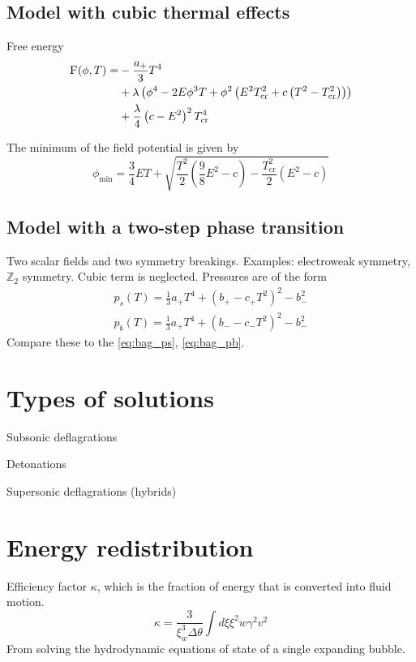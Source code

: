 \subsection{Model with cubic thermal effects}
Free energy
\cite[eq. 45]{giese_2020}
\begin{align}
\begin{split}
\textsc{F}(\phi, T) =
&- \frac{a_+}{3} T^4 \\
&+ \lambda \left( \phi^4 - 2E\phi^3 T + \phi^2 \left( E^2 T_\text{cr}^2 + c \left( T^2 - T_\text{cr}^2 \right) \right) \right) \\
&+ \frac{\lambda}{4} \left( c - E^2 \right)^2 T_\text{cr}^4
\end{split}
\end{align}

The minimum of the field potential is given by
\cite[eq. 46]{giese_2020}
\begin{equation}
\phi_\text{min} = \frac{3}{4} ET + \sqrt{\frac{T^2}{2}(\frac{9}{8}E^2 - c) - \frac{T_\text{cr}^2}{2} (E^2 - c)}
\end{equation}

\subsection{Model with a two-step phase transition}
Two scalar fields and two symmetry breakings. Examples: electroweak symmetry, $\mathbb{Z}_2$ symmetry.
Cubic term is neglected.
Pressures are of the form
\cite[eq. 47-48]{giese_2020}
\begin{align}
p_s(T) = \frac{1}{3}a_+ T^4 + (b_+ - c_+ T^2)^2 - b_-^2 \\
p_b(T) = \frac{1}{3}a_+ T^4 + (b_- - c_-T^2)^2 - b_-^2
\end{align}
Compare these to the \eqref{eq:bag_ps}, \eqref{eq:bag_pb}.



\section{Types of solutions}

Subsonic deflagrations

Detonations

Supersonic deflagrations (hybrids)


\section{Energy redistribution}
Efficiency factor $\kappa$, which is the fraction of energy that is converted into fluid motion.
\begin{equation}
\kappa = \frac{3}{\xi_w^3 \Delta \theta} \int d\xi \xi^2 w \gamma^2 v^2
\end{equation}
From solving the hydrodynamic equations of state of a single expanding bubble.

